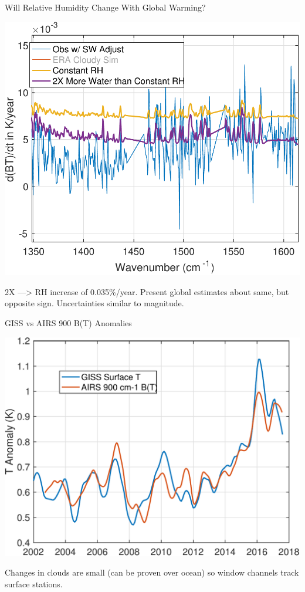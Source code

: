 \documentclass[10pt,t]{beamer}
\begin{document}
\begin{frame}[label={sec:org77b2448}]{Will Relative Humidity Change With Global Warming?}
\vspace{-0.1in}
\begin{center}
\includegraphics[width=0.7\linewidth]{./Figs/Pdf/global_dbt_l1c_minus_greenhouse_gases_swadjust_vs_era_water_RH_noera.pdf}
\end{center}
\vspace{-0.1in}
\small
2X ---> RH increase of 0.035\%/year.  Present global estimates about same, but opposite sign.  Uncertainties similar to magnitude.
\end{frame}

\begin{frame}[label={sec:org5e53653}]{GISS vs AIRS 900 \wn B(T) Anomalies}
\vspace{-0.1in}
\begin{center}
\includegraphics[width=0.8\linewidth]{./Figs/Pdf/giss_sfct_vs_airs_900cmbt.pdf}
\end{center}
\vspace{-0.05in}
\small
Changes in clouds are small (can be proven over ocean) so window channels track surface stations.  
\end{frame}
\end{document}
